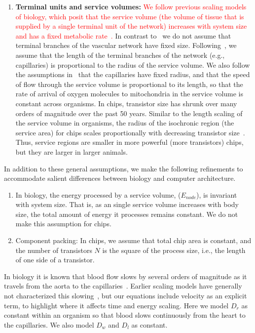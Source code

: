 \documentclass[12pt]{article}
\newcommand{\red}[1]{\textcolor{red}{#1}}
\begin{document}
\begin{enumerate}
\item {\bf Terminal units and service volumes:} \red{We follow previous scaling
    models of biology, which posit that the service volume (the volume of
    tissue that is supplied by a single terminal unit of the network) increases with
  system size and has a fixed metabolic rate~\cite{west97, banavar10}.}  In contrast to~\cite{west97} we do not assume that terminal branches of the vascular network have fixed size. Following~\cite{banavar10}, we assume that the length of the terminal branches of the network (e.g., capillaries) is
  proportional to the radius of the service volume.  We also follow
  the assumptions in~\cite{banavar10} that the capillaries have fixed
  radius, and that the speed of flow through the service volume is
  proportional to its length, so that the rate of arrival of oxygen
  molecules to mitochondria in the service volume is constant across organisms.   In
  chips, transistor size has shrunk over many orders of
  magnitude over the past 50 years.
Similar to the length scaling of the service volume in organisms, the
radius of the isochronic region (the service area) for chips scales
proportionally with decreasing transistor size~\cite{moses08}. Thus,
service regions are smaller in more powerful (more transistors) chips, but they are larger in larger animals.
\end{enumerate}

In addition to these general assumptions, we make the following
refinements to accommodate salient differences between biology and computer architecture.
\begin{enumerate}
\item In biology, the energy processed by a service volume,
  ($E_{node}$), is invariant with system size. That is, as an single service volume
  increases with body size, the total amount of energy it processes
  remains constant.   We do not make this assumption for chips.

\item Component packing: In chips, we assume that total chip area is constant, and the
  number of transistors $N$ is the square of the process size, i.e.,
  the length of one side of a transistor. 

\end{enumerate}

\noindent 

In biology it is known that blood flow slows by several orders of magnitude as
it travels from the aorta to the capillaries~\cite{west97}.
Earlier scaling models have generally not characterized this
slowing~\cite{west97, banavar10}, but
our equations include velocity as an explicit term, to highlight where it affects time and energy
scaling. Here we model $D_r$ as constant within an organism so that blood slows continuously from the heart to the capillaries. We also model $D_w$ and $D_l$ as constant.
\end{document}
